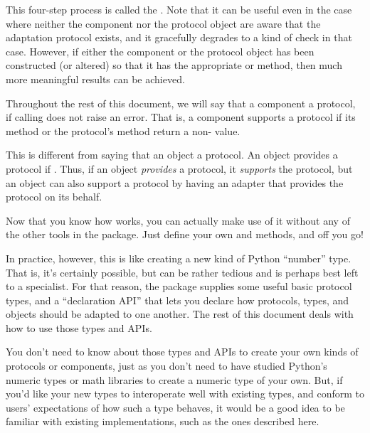 \begin{verbatim%
}
\begin{verbatim%
}
\begin{enumerate}
\end{enumerate}

This four-step process is called the .  Note
that it can be useful even in the case where neither the component nor the
protocol object are aware that the adaptation protocol exists, and it
gracefully degrades to a kind of  check in that
case.  However, if either the component or the protocol object has been
constructed (or altered) so that it has the appropriate 
or  method, then much more meaningful results can be
achieved.

Throughout the rest of this document, we will say that a component
 a protocol, if calling  does
not raise an error.  That is, a component supports a protocol if its
 method or the protocol's  method
return a non- value.

This is different from saying that an object  a protocol.  An
object provides a protocol if .  Thus,
if an object \emph{provides} a protocol, it \emph{supports} the protocol, but
an object can also support a protocol by having an adapter that provides the
protocol on its behalf.

Now that you know how  works, you can actually make use of it
without any of the other tools in the  package.  Just define
your own  and  methods, and off
you go!






In practice, however, this is like creating a new kind of Python ``number''
type.  That is, it's certainly possible, but can be rather tedious and is
perhaps best left to a specialist.  For that reason, the 
package supplies some useful basic protocol types, and a ``declaration API''
that lets you declare how protocols, types, and objects should be adapted to
one another.  The rest of this document deals with how to use those types and
APIs.

You don't need to know about those types and APIs to create your own kinds of
protocols or components, just as you don't need to have studied Python's
numeric types or math libraries to create a numeric type of your own.  But,
if you'd like your new types to interoperate well with existing types, and
conform to users' expectations of how such a type behaves, it would be a good
idea to be familiar with existing implementations, such as the ones described
here.



























\end{verbatim%
}
\end{verbatim%
}
